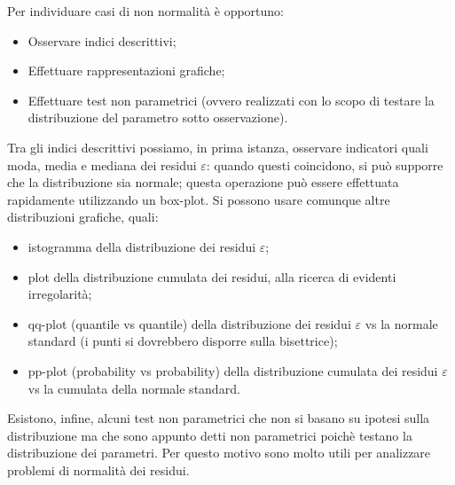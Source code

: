 \documentclass[a4page, 11pt]{article} %
\begin{document}
Per individuare casi di non normalità è opportuno:
\begin{itemize}[noitemsep]
\item Osservare indici descrittivi;
\item Effettuare rappresentazioni grafiche;
\item Effettuare test non parametrici (ovvero realizzati con lo scopo di testare la distribuzione del parametro sotto osservazione).
\end{itemize}
Tra gli indici descrittivi possiamo, in prima istanza, osservare indicatori quali moda, media e mediana dei residui $\varepsilon$: quando questi coincidono, si può supporre che la distribuzione sia normale; questa operazione può essere effettuata rapidamente utilizzando un box-plot.
Si possono usare comunque altre distribuzioni grafiche, quali:
\begin{itemize}[noitemsep]
  \item istogramma della distribuzione dei residui $\varepsilon$;
  \item plot della distribuzione cumulata dei residui, alla ricerca di evidenti irregolarità;
  \item qq-plot (quantile vs quantile) della distribuzione dei residui $\varepsilon$ vs la normale standard (i punti si dovrebbero disporre sulla bisettrice);
  \item pp-plot (probability vs probability) della distribuzione cumulata dei residui $\varepsilon$ vs la cumulata della normale standard. 
\end{itemize}
Esistono, infine, alcuni test non parametrici che non si basano su ipotesi sulla distribuzione ma che sono appunto detti non parametrici poichè testano la distribuzione dei parametri. Per questo motivo sono molto utili per analizzare problemi di normalità dei residui.
\end{document}
